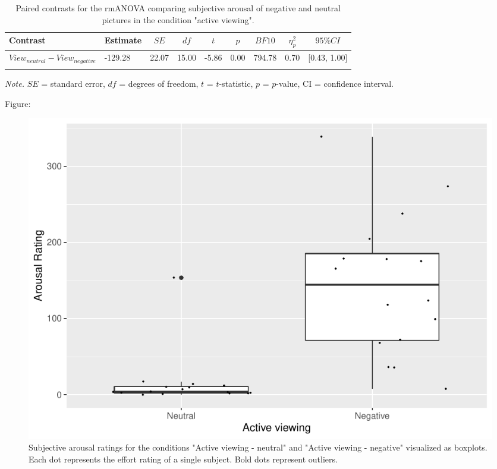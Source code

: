\documentclass[
  english,
  man,floatsintext]{apa6}
\begin{document}
\begin{table}[H]

\begin{center}
\begin{threeparttable}

\caption{\label{tab:unnamed-chunk-3}Paired contrasts for the rmANOVA comparing subjective arousal of negative and neutral pictures in the condition "active viewing".}

\begin{tabular}{lllllllll}
\toprule
Contrast & \multicolumn{1}{c}{Estimate} & \multicolumn{1}{c}{$SE$} & \multicolumn{1}{c}{$df$} & \multicolumn{1}{c}{$t$} & \multicolumn{1}{c}{$p$} & \multicolumn{1}{c}{$BF10$} & \multicolumn{1}{c}{$\eta_{p}^{2}$} & \multicolumn{1}{c}{$95\% CI$}\\
\midrule
$View_{neutral} - View_{negative}$ & -129.28 & 22.07 & 15.00 & -5.86 & 0.00 & 794.78 & 0.70 & {}[0.43, 1.00]\\
\bottomrule
\addlinespace
\end{tabular}

\begin{tablenotes}[para]
\normalsize{\textit{Note.} $SE$ = standard error, $df$ = degrees of freedom, $t$ = $t$-statistic, $p$ = $p$-value, CI = confidence interval.}
\end{tablenotes}

\end{threeparttable}
\end{center}

\end{table}

Figure:

\begin{figure}[H]
\includegraphics[width=0.75\linewidth]{Manuscript_ERED_Stage1_files/figure-latex/FigSubjArousalViewPilot-1} \caption{Subjective arousal ratings for the conditions "Active viewing - neutral" and "Active viewing - negative" visualized as boxplots. Each dot represents the effort rating of a single subject. Bold dots represent outliers.}\label{fig:FigSubjArousalViewPilot}
\end{figure}
\end{document}
